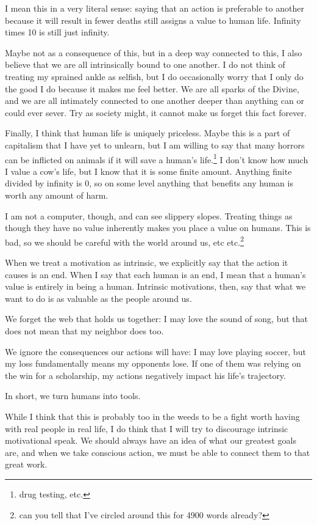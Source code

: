 \documentclass[12pt]{article}
\renewcommand{\,}{\textsuperscript{,}}
\begin{document}
I mean this in a very literal sense: saying that an action is preferable to another because it will result in fewer deaths still assigns a value to human life.  
Infinity times 10 is still just infinity.

Maybe not as a consequence of this, but in a deep way connected to this, I also believe that we are all intrinsically bound to one another.  
I do not think of treating my sprained ankle as selfish, but I do occasionally worry that I only do the good I do because it makes me feel better.  
We are all sparks of the Divine, and we are all intimately connected to one another deeper than anything can or could ever sever.  
Try as society might, it cannot make us forget this fact forever.

Finally, I think that human life is uniquely priceless.  
Maybe this is a part of capitalism that I have yet to unlearn, but I am willing to say that many horrors can be inflicted on animals if it will save a human's life.\footnote{drug testing, etc.}  
I don't know how much I value a cow's life, but I know that it is some finite amount.  
Anything finite divided by infinity is 0, so on some level anything that benefits any human is worth any amount of harm.

I am not a computer, though, and can see slippery slopes.  
Treating things as though they have no value inherently makes you place a value on humans.  
This is bad, so we should be careful with the world around us, etc etc.\footnote{can you tell that I've circled around this for 4900 words already?}

When we treat a motivation as intrinsic, we explicitly say that the action it causes is an end.  
When I say that each human is an end, I mean that a human's value is entirely in being a human.  
Intrinsic motivations, then, say that what we want to do is as valuable as the people around us.

We forget the web that holds us together: I may love the sound of song, but that does not mean that my neighbor does too.

We ignore the consequences our actions will have: I may love playing soccer, but my loss fundamentally means my opponents lose. If one of them was relying on the win for a scholarship, my actions negatively impact his life's trajectory.

In short, we turn humans into tools.

While I think that this is probably too in the weeds to be a fight worth having with real people in real life, I do think that I will try to discourage intrinsic motivational speak.  
We should always have an idea of what our greatest goals are, and when we take conscious action, we must be able to connect them to that great work.
\end{document}
